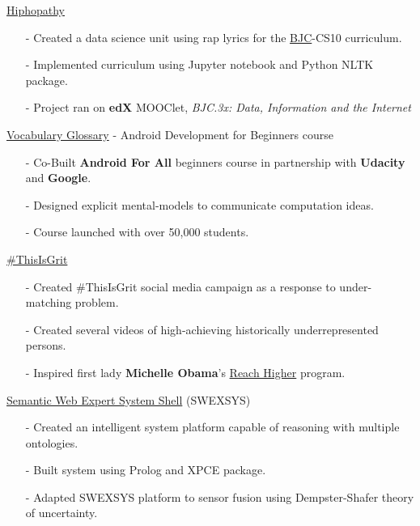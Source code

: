 \documentclass[11pt,article,oneside]{memoir}
\begin{document}
\ind \href{https://github.com/omoju/hiphopathy}{Hiphopathy}
\begin{itemize}[noitemsep,nolistsep]
\item[-] Created a data science unit using rap lyrics for the \href{http://bjc.berkeley.edu/}{BJC}-CS10 curriculum. 
\item[-] Implemented curriculum using Jupyter notebook and Python NLTK package.
\item[-] Project ran on \textbf{edX} MOOClet, \textit{BJC.3x: Data, Information and the Internet}
\end{itemize}

\ind \href{https://developers.google.com/android/for-all/vocab-words/}{Vocabulary Glossary} - Android Development for Beginners course
\begin{itemize}[noitemsep,nolistsep]
\item[-] Co-Built \textbf{Android For All} beginners course in partnership with \textbf{Udacity} and \textbf{Google}. 
\item[-] Designed explicit mental-models to communicate computation ideas.
\item[-] Course launched with over 50,000 students.
\end{itemize}

\ind \href{https://www.youtube.com/channel/UCZK66JujoN3KY3sak2kEa2w?&ab_channel=ThisIsGRIT}{\#ThisIsGrit}
\begin{itemize}[noitemsep,nolistsep]
\item[-] Created \#ThisIsGrit social media campaign as a response to under-matching problem.
\item[-] Created several videos of high-achieving historically underrepresented persons.
\item[-] Inspired first lady \textbf{Michelle Obama}'s \href{https://obamawhitehouse.archives.gov/reach-higher}{Reach Higher} program.
\end{itemize}

\ind \href{https://github.com/omoju/SWEXSYS}{Semantic Web Expert System Shell} (SWEXSYS)
\begin{itemize}[noitemsep,nolistsep]
\item[-] Created an intelligent system platform capable of reasoning with multiple ontologies.
\item[-] Built system using Prolog and XPCE package.
\item[-] Adapted SWEXSYS platform to sensor fusion using Dempster-Shafer theory of uncertainty.
\end{itemize}
\end{document}
